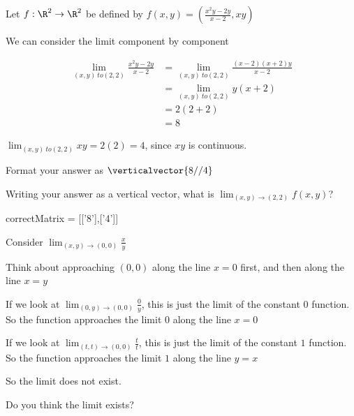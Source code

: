 \documentclass{ximera}
\begin{document}
	\begin{question}
		Let $f:\R^2 \to \R^2$ be defined by $f(x,y) = (\frac{x^2y-2y}{x-2},xy)$
		\begin{solution}
			\begin{hint}
				We can consider the limit component by component
			\end{hint}
			\begin{hint}
				\begin{align*}
					\lim_{(x,y) \ to (2,2)} \frac{x^2y-2y}{x-2} &= \lim_{(x,y) \ to (2,2)} \frac{(x-2)(x+2)y}{x-2}\\
						&= \lim_{(x,y) \ to (2,2)} y(x+2)\\
						&= 2(2+2)\\
						&= 8
				\end{align*}
			\end{hint}
			\begin{hint}
				$\lim_{(x,y) \ to (2,2)} xy = 2(2) =4$, since $xy$ is continuous.
			\end{hint}
			\begin{hint}
				Format your answer as $\verticalvector{8//4}$
			\end{hint}
			Writing your answer as a vertical vector, what is $\lim_{(x,y) \to (2,2)} f(x,y)$?
			\begin{matrix-answer}[name  = v]
			 	correctMatrix  = [['8'],['4']]
			\end{matrix-answer}
		\end{solution}
	\end{question}
	
	\begin{question}
		Consider $\lim_{(x,y) \to (0,0)} \frac{x}{y}$
		\begin{solution}
			\begin{hint}
				Think about approaching $(0,0)$ along the line $x=0$ first, and then along the line $x=y$
			\end{hint}
			\begin{hint}
				If we look at $\lim_{(0,y) \to (0,0)} \frac{0}{y}$, this is just the limit of the constant $0$ function.  So the function approaches the limit $0$ along
				the line $x=0$
			\end{hint}
			\begin{hint}
				If we look at $\lim_{(t,t) \to (0,0)} \frac{t}{t}$, this is just the limit of the constant $1$ function.  So the function approaches the limit $1$ along the 
				line $y=x$
			\end{hint}
			\begin{hint}
				So the limit does not exist.
			\end{hint}
			Do you think the limit exists?
				\begin{multiple-choice}
					\choice{Yes}
					\choice[correct]{No}
				\end{multiple-choice}
		\end{solution}
	\end{question}
	
\end{document}
